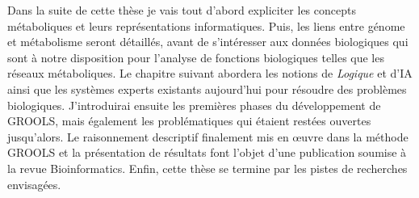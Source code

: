 \begin{refsegment}

Dans la suite de cette thèse je vais tout d’abord expliciter les concepts métaboliques et leurs représentations informatiques. Puis, les liens entre génome et métabolisme seront détaillés, avant de s'intéresser aux données biologiques qui sont à notre disposition pour l’analyse de fonctions biologiques telles que les réseaux métaboliques. Le chapitre suivant abordera les notions de \textit{Logique} et d'\gls{IA} ainsi que les systèmes experts existants aujourd'hui pour résoudre des problèmes biologiques. J'introduirai ensuite les premières phases du développement de \gls{GROOLS}, mais également les problématiques qui étaient restées ouvertes jusqu'alors. Le raisonnement descriptif finalement mis en œuvre dans la méthode \gls{GROOLS} et la présentation de résultats font l’objet d’une publication soumise à la revue Bioinformatics. Enfin, cette thèse se termine par les pistes de recherches envisagées.


\subbibliography
\end{refsegment}